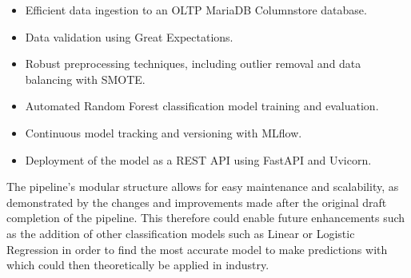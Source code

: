 \documentclass[12pt]{report}
\begin{document}
\begin{itemize}
    \item Efficient data ingestion to an OLTP MariaDB Columnstore database.
    \item Data validation using Great Expectations.
    \item Robust preprocessing techniques, including outlier removal and data balancing with SMOTE.
    \item Automated Random Forest classification model training and evaluation.
    \item Continuous model tracking and versioning with MLflow.
    \item Deployment of the model as a REST API using FastAPI and Uvicorn.
\end{itemize}

The pipeline's modular structure allows for easy maintenance and scalability, as demonstrated by the changes and improvements 
made after the original draft completion of the pipeline. This therefore could enable future enhancements such as the addition 
of other classification models such as Linear or Logistic Regression in order to find the most accurate model to make predictions with 
which could then theoretically be applied in industry.
   

% 





\end{document}

